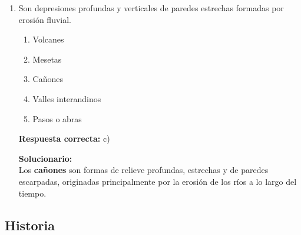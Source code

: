 \begin{enumerate}
	\vspace{2mm}
	\textbf{Solucionario:}\\
	La \textbf{escala} expresa la proporción entre una distancia en el mapa y su correspondiente distancia real en el terreno. Es un elemento fundamental de la cartografía.
	
	\vspace{6mm}
	
	\item Son depresiones profundas y verticales de paredes estrechas formadas por erosión fluvial.
	\begin{enumerate}[label=\alph*)]
		\item Volcanes
		\item Mesetas
		\item Cañones
		\item Valles interandinos
		\item Pasos o abras
	\end{enumerate}
	\textbf{Respuesta correcta:} c)
	
	\vspace{2mm}
	\textbf{Solucionario:}\\
	Los \textbf{cañones} son formas de relieve profundas, estrechas y de paredes escarpadas, originadas principalmente por la erosión de los ríos a lo largo del tiempo.
	
	\vspace{6mm}
	
\end{enumerate}

\subsection*{Historia}

